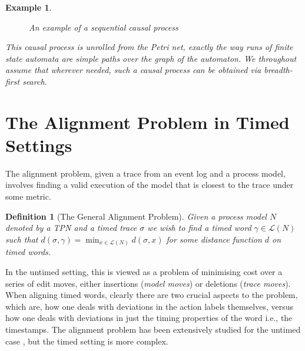 \documentclass[conference]{IEEEtran}
\newtheorem{definition}{Definition}
\newtheorem{example}{Example}
\begin{document}
\begin{example}
\begin{figure}[h]
			\centering
			\caption{An example of a sequential causal process}
						\label{CP2}
		\end{figure}   
        This causal process is unrolled from the Petri net, exactly the way runs of finite state automata are simple paths over the graph of the automaton. 
        We throughout assume that wherever needed, such a causal process can be obtained via breadth-first search. 
    \end{example}

	\section{The Alignment Problem in Timed Settings}\label{sec:alignmentpb}
	The alignment problem, given a trace from an event log and a process model, involves finding a valid execution of the model that is closest to the trace under some metric.
	
	\begin{definition}[The General Alignment Problem]
		Given a process model $N$ denoted by a TPN and a timed trace $\sigma$ we wish to find a timed word $\gamma \in \mathcal{L}(N)$ such that $d(\sigma, \gamma) = \min_{x \in \mathcal{L}(N)} d(\sigma, x)$ for some distance function $d$ on timed words. 
		
	\end{definition}
	
	In the untimed setting, this is viewed as a problem of minimising cost over a series of edit moves, either insertions (\textit{model moves}) or deletions (\textit{trace moves}). When aligning timed words, clearly there are two crucial aspects to the problem, which are, how one deals with deviations in the action labels themselves, versus how one deals with deviations in just the timing properties of the word i.e., the timestamps. The alignment problem has been extensively studied for the untimed case \cite{Adriansyah2014AligningOA} \cite{BCC21}, %
	but the timed setting is more complex. 
	
\end{document}
